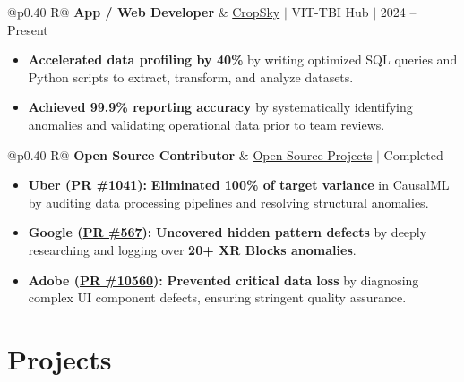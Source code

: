 \documentclass[a4paper,11pt]{article}
\newcommand{\subheading}[1]{\textbf{#1}}
\newcommand{\meta}[1]{{\fontsize{10}{12}\selectfont\textcolor[HTML]{3A3A3A}{#1}}}
\newcommand{\ulink}[2]{\href{#1}{#2}}
\begin{document}
\begin{tabularx}{\linewidth}{@{}p{0.40\linewidth} R@{}}
\subheading{App / Web Developer} & \meta{\ulink{https://sites.google.com/view/cropsky/home}{CropSky} $|$ VIT-TBI Hub $|$ 2024 -- Present}
\end{tabularx}
\begin{itemize}[nosep, leftmargin=1.5em, itemsep=2pt, topsep=2pt]
  \item {\color[HTML]{0A0A0A}\fontsize{11}{14}\selectfont \textbf{Accelerated data profiling by 40\%} by writing optimized SQL queries and Python scripts to extract, transform, and analyze datasets.}
  \item {\color[HTML]{0A0A0A}\fontsize{11}{14}\selectfont \textbf{Achieved 99.9\% reporting accuracy} by systematically identifying anomalies and validating operational data prior to team reviews.}
\end{itemize}

\begin{tabularx}{\linewidth}{@{}p{0.40\linewidth} R@{}}
\subheading{Open Source Contributor} & \meta{\ulink{https://github.com/su-jin1425/My-Open-Source-Contributions}{Open Source Projects} $|$ Completed}
\end{tabularx}
\begin{itemize}[nosep, leftmargin=1.5em, itemsep=2pt, topsep=2pt]
  \item {\color[HTML]{0A0A0A}\fontsize{11}{14}\selectfont \textbf{Uber (\ulink{https://github.com/uber/causalml/pull/1041}{PR \#1041}):} \textbf{Eliminated 100\% of target variance} in CausalML by auditing data processing pipelines and resolving structural anomalies.}
  \item {\color[HTML]{0A0A0A}\fontsize{11}{14}\selectfont \textbf{Google (\ulink{https://github.com/google/xrblocks/pull/567}{PR \#567}):} \textbf{Uncovered hidden pattern defects} by deeply researching and logging over \textbf{20+ XR Blocks anomalies}.}
  \item {\color[HTML]{0A0A0A}\fontsize{11}{14}\selectfont \textbf{Adobe (\ulink{https://github.com/adobe/react-spectrum/pull/10560}{PR \#10560}):} \textbf{Prevented critical data loss} by diagnosing complex UI component defects, ensuring stringent quality assurance.}
\end{itemize}

\section{Projects}
\vspace{2pt}
\end{document}
